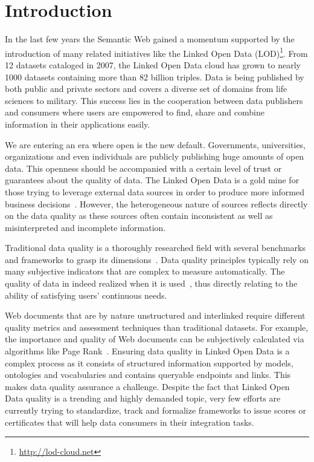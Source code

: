 \documentclass[onecolumn, crcready]{../../Tools/LaTEX/iosart2c}
\begin{document}

\section{Introduction}
\label{sec:introduction}
In the last few years the Semantic Web gained a momentum supported by the introduction of many related initiatives like the Linked Open Data (LOD)\footnote{\url{http://lod-cloud.net}}. From 12 datasets cataloged in 2007, the Linked Open Data cloud has grown to nearly 1000 datasets containing more than 82 billion triples. Data is being published by both public and private sectors and covers a diverse set of domains from life sciences to military. This success lies in the cooperation between data publishers and consumers where users are empowered to find, share and combine information in their applications easily.

We are entering an era where open is the new default. Governments, universities, organizations and even individuals are publicly publishing huge amounts of open data. This openness should be accompanied with a certain level of trust or guarantees about the quality of data. The Linked Open Data is a gold mine for those trying to leverage external data sources in order to produce more informed business decisions~\cite{Boyd:Article:11}. However, the heterogeneous nature of sources reflects directly on the data quality as these sources often contain inconsistent as well as misinterpreted and incomplete information.

Traditional data quality is a thoroughly researched field with several benchmarks and frameworks to grasp its dimensions~\cite{Kahn:ACM:02,Stvilia:ASIST:07,Wang:MIS:96}. Data quality principles typically rely on many subjective indicators that are complex to measure automatically. The quality of data in indeed realized when it is used~\cite{Juran:McGraw:99}, thus directly relating to the ability of satisfying users' continuous needs.

Web documents that are by nature unstructured and interlinked require different quality metrics and assessment techniques than traditional datasets. For example, the importance and quality of Web documents can be subjectively calculated via algorithms like Page Rank~\cite{ Page:TechReport:98}. Ensuring data quality in Linked Open Data is a complex process as it consists of structured information supported by models, ontologies and vocabularies and contains queryable endpoints and links. This makes data quality assurance a challenge. Despite the fact that Linked Open Data quality is a trending and highly demanded topic, very few efforts are currently trying to standardize, track and formalize frameworks to issue scores or certificates that will help data consumers in their integration tasks.
\end{document}
